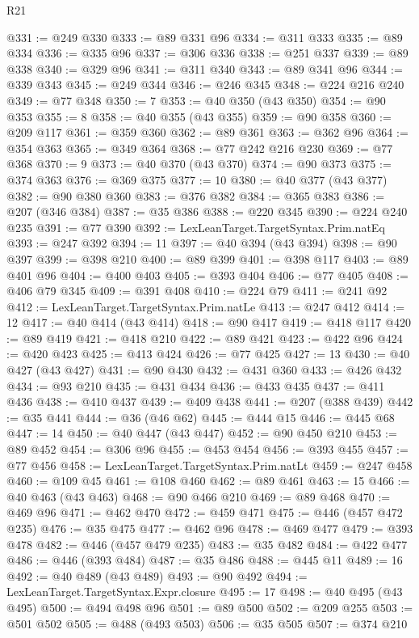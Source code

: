 \begin{lexlean}{R21}
\begin{coremodule}
@331 := @249 @330
@333 := @89 @331 @96
@334 := @311 @333
@335 := @89 @334
@336 := @335 @96
@337 := @306 @336
@338 := @251 @337
@339 := @89 @338
@340 := @329 @96
@341 := @311 @340
@343 := @89 @341 @96
@344 := @339 @343
@345 := @249 @344
@346 := @246 @345
@348 := @224 @216 @240
@349 := @77 @348
@350 := 7
@353 := @40 @350 (@43 @350)
@354 := @90 @353
@355 := 8
@358 := @40 @355 (@43 @355)
@359 := @90 @358
@360 := @209 @117
@361 := @359 @360
@362 := @89 @361
@363 := @362 @96
@364 := @354 @363
@365 := @349 @364
@368 := @77 @242 @216 @230
@369 := @77 @368
@370 := 9
@373 := @40 @370 (@43 @370)
@374 := @90 @373
@375 := @374 @363
@376 := @369 @375
@377 := 10
@380 := @40 @377 (@43 @377)
@382 := @90 @380 @360
@383 := @376 @382
@384 := @365 @383
@386 := @207 (@346 @384)
@387 := @35 @386
@388 := @220 @345
@390 := @224 @240 @235
@391 := @77 @390
@392 := LexLeanTarget.TargetSyntax.Prim.natEq
@393 := @247 @392
@394 := 11
@397 := @40 @394 (@43 @394)
@398 := @90 @397
@399 := @398 @210
@400 := @89 @399
@401 := @398 @117
@403 := @89 @401 @96
@404 := @400 @403
@405 := @393 @404
@406 := @77 @405
@408 := @406 @79 @345
@409 := @391 @408
@410 := @224 @79
@411 := @241 @92
@412 := LexLeanTarget.TargetSyntax.Prim.natLe
@413 := @247 @412
@414 := 12
@417 := @40 @414 (@43 @414)
@418 := @90 @417
@419 := @418 @117
@420 := @89 @419
@421 := @418 @210
@422 := @89 @421
@423 := @422 @96
@424 := @420 @423
@425 := @413 @424
@426 := @77 @425
@427 := 13
@430 := @40 @427 (@43 @427)
@431 := @90 @430
@432 := @431 @360
@433 := @426 @432
@434 := @93 @210
@435 := @431 @434
@436 := @433 @435
@437 := @411 @436
@438 := @410 @437
@439 := @409 @438
@441 := @207 (@388 @439)
@442 := @35 @441
@444 := @36 (@46 @62)
@445 := @444 @15
@446 := @445 @68
@447 := 14
@450 := @40 @447 (@43 @447)
@452 := @90 @450 @210
@453 := @89 @452
@454 := @306 @96
@455 := @453 @454
@456 := @393 @455
@457 := @77 @456
@458 := LexLeanTarget.TargetSyntax.Prim.natLt
@459 := @247 @458
@460 := @109 @45
@461 := @108 @460
@462 := @89 @461
@463 := 15
@466 := @40 @463 (@43 @463)
@468 := @90 @466 @210
@469 := @89 @468
@470 := @469 @96
@471 := @462 @470
@472 := @459 @471
@475 := @446 (@457 @472 @235)
@476 := @35 @475
@477 := @462 @96
@478 := @469 @477
@479 := @393 @478
@482 := @446 (@457 @479 @235)
@483 := @35 @482
@484 := @422 @477
@486 := @446 (@393 @484)
@487 := @35 @486
@488 := @445 @11
@489 := 16
@492 := @40 @489 (@43 @489)
@493 := @90 @492
@494 := LexLeanTarget.TargetSyntax.Expr.closure
@495 := 17
@498 := @40 @495 (@43 @495)
@500 := @494 @498 @96
@501 := @89 @500
@502 := @209 @255
@503 := @501 @502
@505 := @488 (@493 @503)
@506 := @35 @505
@507 := @374 @210

\end{coremodule}
\end{lexlean}
